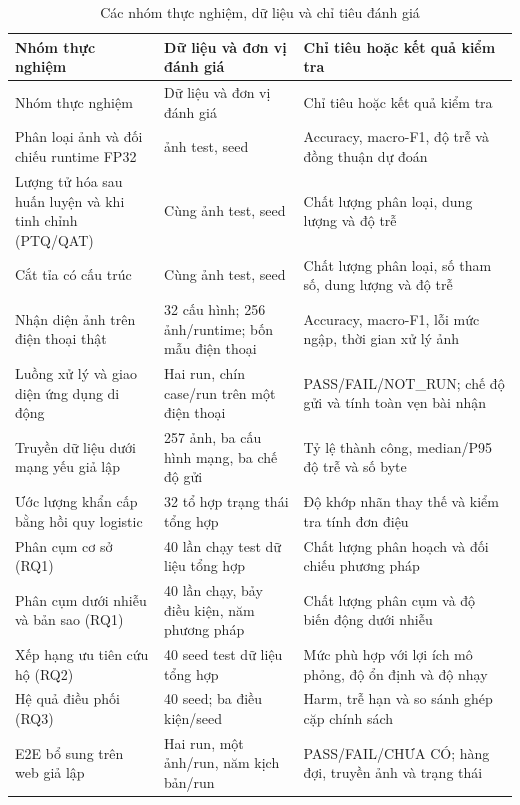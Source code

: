 \begin{longtable}{P{.28\textwidth}P{.30\textwidth}P{.31\textwidth}}
\caption{Các nhóm thực nghiệm, dữ liệu và chỉ tiêu đánh giá}\label{tab:experiment-map}\\
\toprule Nhóm thực nghiệm & Dữ liệu và đơn vị đánh giá & Chỉ tiêu hoặc kết quả kiểm tra \\\midrule\endfirsthead
\toprule Nhóm thực nghiệm & Dữ liệu và đơn vị đánh giá & Chỉ tiêu hoặc kết quả kiểm tra \\\midrule\endhead
Phân loại ảnh và đối chiếu runtime FP32 & \ImageTest{} ảnh test, seed \BenchmarkSeed{} & Accuracy, macro-F1, độ trễ và đồng thuận dự đoán \\
Lượng tử hóa sau huấn luyện và khi tinh chỉnh (PTQ/QAT) & Cùng \ImageTest{} ảnh test, seed \QuantizationSeed{} & Chất lượng phân loại, dung lượng và độ trễ \\
Cắt tỉa có cấu trúc & Cùng \ImageTest{} ảnh test, seed \PruningSeed{} & Chất lượng phân loại, số tham số, dung lượng và độ trễ \\
Nhận diện ảnh trên điện thoại thật & 32 cấu hình; 256 ảnh/runtime; bốn mẫu điện thoại & Accuracy, macro-F1, lỗi mức ngập, thời gian xử lý ảnh \\
Luồng xử lý và giao diện ứng dụng di động & Hai run, chín case/run trên một điện thoại & PASS/FAIL/NOT\_RUN; chế độ gửi và tính toàn vẹn bài nhận \\
Truyền dữ liệu dưới mạng yếu giả lập & 257 ảnh, ba cấu hình mạng, ba chế độ gửi & Tỷ lệ thành công, median/P95 độ trễ và số byte \\
Ước lượng khẩn cấp bằng hồi quy logistic & 32 tổ hợp trạng thái tổng hợp & Độ khớp nhãn thay thế và kiểm tra tính đơn điệu \\
Phân cụm cơ sở (RQ1) & 40 lần chạy test dữ liệu tổng hợp & Chất lượng phân hoạch và đối chiếu phương pháp \\
Phân cụm dưới nhiễu và bản sao (RQ1) & 40 lần chạy, bảy điều kiện, năm phương pháp & Chất lượng phân cụm và độ biến động dưới nhiễu \\
Xếp hạng ưu tiên cứu hộ (RQ2) & 40 seed test dữ liệu tổng hợp & Mức phù hợp với lợi ích mô phỏng, độ ổn định và độ nhạy \\
Hệ quả điều phối (RQ3) & 40 seed; ba điều kiện/seed & Harm, trễ hạn và so sánh ghép cặp chính sách \\
E2E bổ sung trên web giả lập & Hai run, một ảnh/run, năm kịch bản/run & PASS/FAIL/CHƯA CÓ; hàng đợi, truyền ảnh và trạng thái \\
\bottomrule
\end{longtable}


